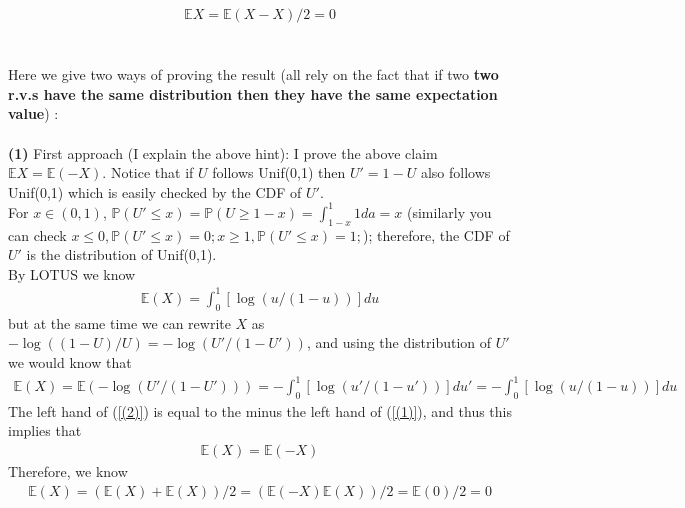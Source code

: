 \begin{exercise}[BH.5.16]
\begin{solution}
\begin{enumerate}
\begin{align*}
    		\mathbb{E}X = \mathbb{E}(X -X)/2=0
    	\end{align*}
    	\\~\\
    	Here we give two ways of proving the result (all rely on the fact that if two \textbf{two r.v.s have the same distribution then they have the same expectation value})   :\\~\\
    	\textbf{(1)} First approach (I explain the above hint): I prove the above claim $\mathbb{E}X = \mathbb{E}(-X)$. Notice that if $U$ follows Unif(0,1) then $U'=1-U$ also follows Unif(0,1) which is easily checked by the CDF of $U'$.\\
    	For  $x\in (0,1)$, $\mathbb{P}\left(U' \leq x \right)= \mathbb{P}\left(U \geq 1-x \right)=\int_{1-x}^{1} 1 da= x$ (similarly you can check $x\leq 0, \mathbb{P}\left(U' \leq x \right)=0;x\geq 1, \mathbb{P}\left(U' \leq x \right)=1; $); therefore, the CDF of $U'$  is the distribution of Unif(0,1). 
    	~\\
    	By LOTUS we know 
    	\begin{align}
    		\mathbb{E}\left(X \right)=	\int_{0}^{1} \left[\log\left(u/(1-u) \right)\right] du \label{(1)}
    	\end{align}  
    	but at the same time we can rewrite $X$ as $-\log((1-U)/U)=-\log(U'/(1-U'))$, and using the distribution of $U'$ we would know that 
    	\begin{align}
    		\mathbb{E}\left(X \right)= \mathbb{E} \left(-\log(U'/(1-U'))\right) = - 	\int_{0}^{1} \left[\log\left(u'/(1-u') \right)\right] du'= - 	\int_{0}^{1} \left[\log\left(u/(1-u) \right)\right] du \label{(2)}
    	\end{align}  
    	The left hand of (\ref{(2)})  is equal to the minus the left hand of (\ref{(1)}), and thus this implies that 
    	\begin{align*}
    		\mathbb{E}(X) = \mathbb{E}(-X)
    	\end{align*} 
    	Therefore, we know 
    	\begin{align*}
    		\mathbb{E}(X) = (\mathbb{E}(X)+ 	\mathbb{E}(X))/2 = (\mathbb{E}(-X)	\mathbb{E}(X))/2 = \mathbb{E}(0)/2=0
    	\end{align*}
    	

\end{enumerate}
\end{solution}
\end{exercise}
